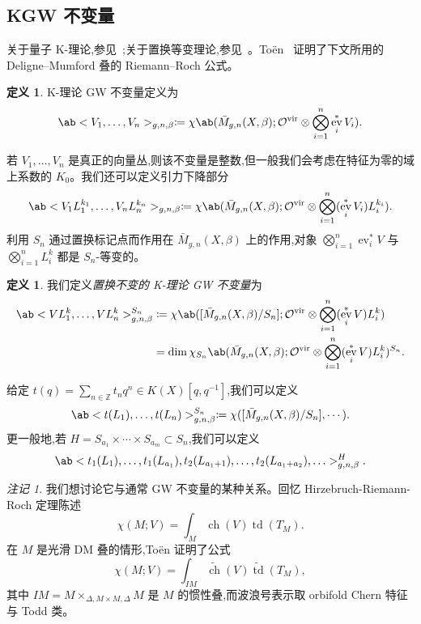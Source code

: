 \documentclass{amsart}
\theoremstyle{definition}
\newtheorem{defn}[thm]{定义}
\theoremstyle{remark}
\newtheorem{rmk}[thm]{注记}
\theoremstyle{plain}
\theoremstyle{definition}
\theoremstyle{remark}
\newcommand{\Z}{\mathbb{Z}}
\newcommand{\mc}[1]{\mathcal{#1}}
\newcommand{\mr}[1]{\mathrm{#1}}
\newcommand{\on}[1]{\operatorname{#1}}
\newcommand{\wt}[1]{\widetilde{#1}}
\newcommand{\1}{\mathbf{1}}
\newcommand{\2}{\mathbf{2}}
\newcommand{\3}{\mathbf{3}}
\newcommand{\vir}{\mr{vir}}
\DeclareMathOperator{\ev}{ev}
\begin{document}
\subsection{KGW 不变量}%
\label{sub:KGW invariants}

关于量子 K-理论,参见~\cite{Lee2004};关于置换等变理论,参见~\cite{Givental2017K1,GiventalK7}。To\"en~\cite{Toen1999} 证明了下文所用的 Deligne--Mumford 叠的 Riemann--Roch 公式。

\begin{defn}
    K-理论 GW 不变量定义为
    \[ \ab<V_1, \ldots, V_n>_{g,n,\beta} \coloneqq \chi\ab(\bar{M}_{g,n}(X, \beta); \mc{O}^{\vir} \otimes \bigotimes_{i=1}^n \ev_i^* V_i). \]
\end{defn}

若 \(V_1, \ldots, V_n\) 是真正的向量丛,则该不变量是整数,但一般我们会考虑在特征为零的域上系数的 \(K_0\)。我们还可以定义引力下降部分
\[ \ab<V_1 L_1^{k_1}, \ldots, V_n L_n^{k_n}>_{g,n,\beta} \coloneqq \chi\ab(\bar{M}_{g,n}(X, \beta); \mc{O}^{\vir} \otimes \bigotimes_{i=1}^n ( \ev_i^* V_i )L_i^{k_i} ). \]
利用 \(S_n\) 通过置换标记点而作用在 \(\bar{M}_{g,n}(X, \beta)\) 上的作用,对象 \(\bigotimes_{i=1}^n \ev_i^* V\) 与 \(\bigotimes_{i=1}^n L_i^k\) 都是 \(S_n\)-等变的。

\begin{defn}
    我们定义\textit{置换不变的 K-理论 GW 不变量}为
    \begin{align*}
        \ab<V L_1^k, \ldots, V L_n^k>_{g,n,\beta}^{S_n} &\coloneqq \chi\ab([ \bar{M}_{g,n}(X, \beta)/S_n ]; \mc{O}^{\vir} \otimes \bigotimes_{i=1}^n ( \ev_i^* V ) L_i^k) \\
        &= \dim \chi_{S_n} \ab(\bar{M}_{g,n}(X, \beta); \mc{O}^{\vir} \otimes \bigotimes_{i=1}^n ( \ev_i^* V ) L_i^k )^{S_n}.
    \end{align*}
\end{defn}

给定 \(t(q) = \sum_{n \in \Z} t_n q^n \in K(X)[q,q^{-1}]\),我们可以定义
\[ \ab< t(L_1), \ldots, t(L_n)>^{S_n}_{g,n,\beta} \coloneqq \chi ([\bar{M}_{g,n}(X,\beta)/S_n], \cdots). \]
更一般地,若 \(H = S_{a_1} \times \cdots \times S_{a_m} \subset S_n\),我们可以定义
\[ \ab<t_1(L_1), \ldots, t_1(L_{a_1}), t_2(L_{a_1+1}), \ldots, t_2(L_{a_1+a_2}), \ldots>_{g,n,\beta}^H. \]

\begin{rmk}
    我们想讨论它与通常 GW 不变量的某种关系。回忆 Hirzebruch-Riemann-Roch 定理陈述
    \[ \chi(M; V) = \int_M \on{ch}(V) \on{td}(T_M). \]
    在 \(M\) 是光滑 DM 叠的情形,To\"en 证明了公式
    \[ \chi(M; V) = \int_{IM} \wt{\on{ch}}(V) \wt{\on{td}}(T_M), \]
    其中 \(IM = M \times_{\Delta, M \times M, \Delta} M\) 是 \(M\) 的惯性叠,而波浪号表示取 orbifold Chern 特征与 Todd 类。
\end{rmk}
\end{document}
